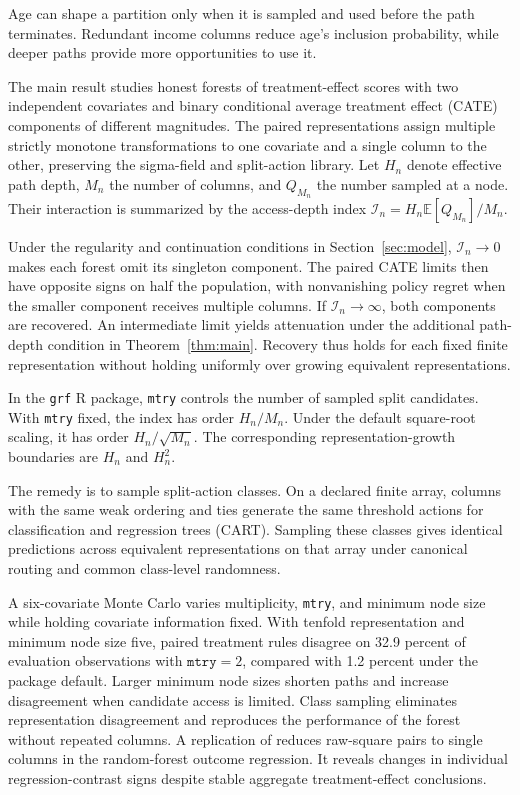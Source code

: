 \documentclass[12pt]{article}
\newcommand{\E}{\mathbb E}
\begin{document}
Age can shape a partition only when it is sampled and used before the path terminates. Redundant income columns reduce age's inclusion probability, while deeper paths provide more opportunities to use it.

The main result studies honest forests of treatment-effect scores with two independent covariates and binary conditional average treatment effect (CATE) components of different magnitudes. The paired representations assign multiple strictly monotone transformations to one covariate and a single column to the other, preserving the sigma-field and split-action library. Let \(H_n\) denote effective path depth, \(M_n\) the number of columns, and \(Q_{M_n}\) the number sampled at a node. Their interaction is summarized by the access-depth index \(\mathcal I_n=H_n\E[Q_{M_n}]/M_n\).

Under the regularity and continuation conditions in Section~\ref{sec:model}, \(\mathcal I_n\to0\) makes each forest omit its singleton component. The paired CATE limits then have opposite signs on half the population, with nonvanishing policy regret when the smaller component receives multiple columns. If \(\mathcal I_n\to\infty\), both components are recovered. An intermediate limit yields attenuation under the additional path-depth condition in Theorem~\ref{thm:main}. Recovery thus holds for each fixed finite representation without holding uniformly over growing equivalent representations.

In the \texttt{grf} R package, \texttt{mtry} controls the number of sampled split candidates. With \texttt{mtry} fixed, the index has order \(H_n/M_n\). Under the default square-root scaling, it has order \(H_n/\sqrt{M_n}\). The corresponding representation-growth boundaries are \(H_n\) and \(H_n^2\).

The remedy is to sample split-action classes. On a declared finite array, columns with the same weak ordering and ties generate the same threshold actions for classification and regression trees (CART). Sampling these classes gives identical predictions across equivalent representations on that array under canonical routing and common class-level randomness.

A six-covariate Monte Carlo varies multiplicity, \texttt{mtry}, and minimum node size while holding covariate information fixed. With tenfold representation and minimum node size five, paired treatment rules disagree on 32.9 percent of evaluation observations with \(\texttt{mtry}=2\), compared with 1.2 percent under the package default. Larger minimum node sizes shorten paths and increase disagreement when candidate access is limited. Class sampling eliminates representation disagreement and reproduces the performance of the forest without repeated columns. A replication of \citet{chernozhukov2022automatic} reduces raw-square pairs to single columns in the random-forest outcome regression. It reveals changes in individual regression-contrast signs despite stable aggregate treatment-effect conclusions.
\end{document}

